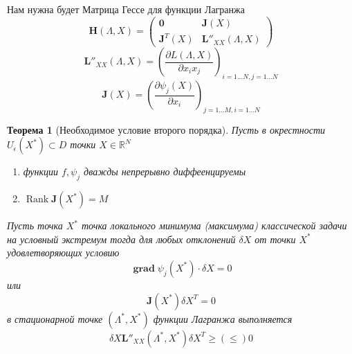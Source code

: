 \documentclass[14pt]{extarticle}
\newtheorem{theorem}{Теорема}
\DeclareMathOperator{\grad}{\textbf{grad}}
\DeclareMathOperator{\rank}{Rank}
\newcommand{\pa}[2]{ \frac{\partial #1}{\partial #2}}
\begin{document}
  Нам нужна будет Матрица Гессе для функции Лагранжа
  \begin{equation}
  \mathbf{H}(\Lambda,X) = 
  \begin{pmatrix} 
	  \mathbf{0} & \mathbf{J}(X)  \\
	  \mathbf{J}^{T}(X) & \mathbf{L}''_{XX}(\Lambda,X)
  \end{pmatrix} 
  \end{equation} 
  \begin{equation}
  \mathbf{L}''_{XX}(\Lambda,X) = (\pa{L(\Lambda,X)}{x_{i} x_{j}})_{i = 1 \dots N , j = 1 \dots N}
  \end{equation} 
  \begin{equation}
  \mathbf{J}(X) = (\pa{\psi_{j}(X)}{x_{i}})_{j = 1 \dots M, i = 1 \dots N}
  \end{equation} 
  \begin{theorem}[Необходимое условие второго порядка]
	  Пусть в окрестности $U_{\epsilon}(X^{*}) \subset D$ 
	  точки $X \in \mathbb{R}^{N}$ 
	  \begin{enumerate}
	  	\item функции $f, \psi_{j}$ 
			дважды непрерывно диффеенцируемы
		\item $\rank \mathbf{J}(X^{*}) = M$
	  \end{enumerate}
	  Пусть точка $X^{*}$ 
	  точка локального минимума (максимума)
	  классической задачи на условный экстремум
	  тогда для любых отклонений $\delta X$ от
	  точки  $X^{*}$ удовлетворяющих условию
	  \begin{equation}
	  \grad \psi_{j}(X^{*}) \cdot \delta X = 0
	  \end{equation} 
	  или
	  \begin{equation}
		  \label{j1}
	  	\mathbf{J}(X^{*}) \delta X^{T} = 0
	  \end{equation}
	  в стационарной точке $(\Lambda^{*} , X^{*})$ 
	  функции Лагранжа выполняется
	  \begin{equation}
	  \delta X \mathbf{L}''_{XX}(\Lambda^{*},X^{*}) \delta X^{T}\ge  (\le ) 0
	  \end{equation} 
  \end{theorem}
\end{document}

